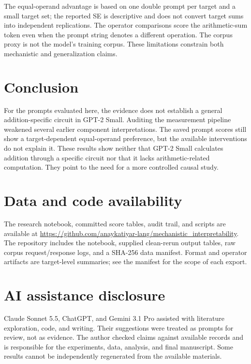 \documentclass[11pt]{article}
\begin{document}
The equal-operand advantage is based on one double prompt per target and a small target set; the reported SE is descriptive and does not convert target sums into independent replications. The operator comparisons score the arithmetic-sum token even when the prompt string denotes a different operation. The corpus proxy is not the model's training corpus. These limitations constrain both mechanistic and generalization claims.

\section{Conclusion}

For the prompts evaluated here, the evidence does not establish a general addition-specific circuit in GPT-2 Small. Auditing the measurement pipeline weakened several earlier component interpretations. The saved prompt scores still show a target-dependent equal-operand preference, but the available interventions do not explain it. These results show neither that GPT-2 Small calculates addition through a specific circuit nor that it lacks arithmetic-related computation. They point to the need for a more controlled causal study.

\section*{Data and code availability}

The research notebook, committed score tables, audit trail, and scripts are available at \url{https://github.com/anaykatiyar-lang/mechanistic_interpretability}. The repository includes the notebook, supplied clean-rerun output tables, raw corpus request/response logs, and a SHA-256 data manifest. Format and operator artifacts are target-level summaries; see the manifest for the scope of each export.

\section*{AI assistance disclosure}

Claude Sonnet 5.5, ChatGPT, and Gemini 3.1 Pro assisted with literature exploration, code, and writing. Their suggestions were treated as prompts for review, not as evidence. The author checked claims against available records and is responsible for the experiments, data, analysis, and final manuscript. Some results cannot be independently regenerated from the available materials.
\end{document}
